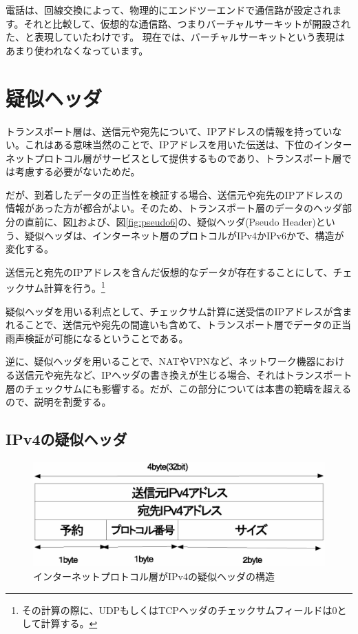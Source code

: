 電話は、回線交換によって、物理的にエンドツーエンドで通信路が設定されます。それと比較して、仮想的な通信路、つまりバーチャルサーキットが開設された、と表現していたわけです。
現在では、バーチャルサーキットという表現はあまり使われなくなっています。

\section{疑似ヘッダ}

トランスポート層は、送信元や宛先について、IPアドレスの情報を持っていない。これはある意味当然のことで、IPアドレスを用いた伝送は、下位のインターネットプロトコル層がサービスとして提供するものであり、トランスポート層では考慮する必要がないためだ。

だが、到着したデータの正当性を検証する場合、送信元や宛先のIPアドレスの情報があった方が都合がよい。そのため、トランスポート層のデータのヘッダ部分の直前に、図\ref{fig:pseudo}および、図\ref{fig:pseudo6}の、疑似ヘッダ(Pseudo Header)という、疑似ヘッダは、インターネット層のプロトコルがIPv4かIPv6かで、構造が変化する。


送信元と宛先のIPアドレスを含んだ仮想的なデータが存在することにして、チェックサム計算を行う。\footnote{その計算の際に、UDPもしくはTCPヘッダのチェックサムフィールドは0として計算する。}

疑似ヘッダを用いる利点として、チェックサム計算に送受信のIPアドレスが含まれることで、送信元や宛先の間違いも含めて、トランスポート層でデータの正当雨声検証が可能になるということである。

逆に、疑似ヘッダを用いることで、NATやVPNなど、ネットワーク機器における送信元や宛先など、IPヘッダの書き換えが生じる場合、それはトランスポート層のチェックサムにも影響する。だが、この部分については本書の範疇を超えるので、説明を割愛する。

\subsection{IPv4の疑似ヘッダ}

\begin{figure}[htbp]
	\includegraphics[width=12cm,clip]{draw/pseudoheader4.eps}
	\caption{インターネットプロトコル層がIPv4の疑似ヘッダの構造}
	\label{fig:pseudo}
\end{figure}

